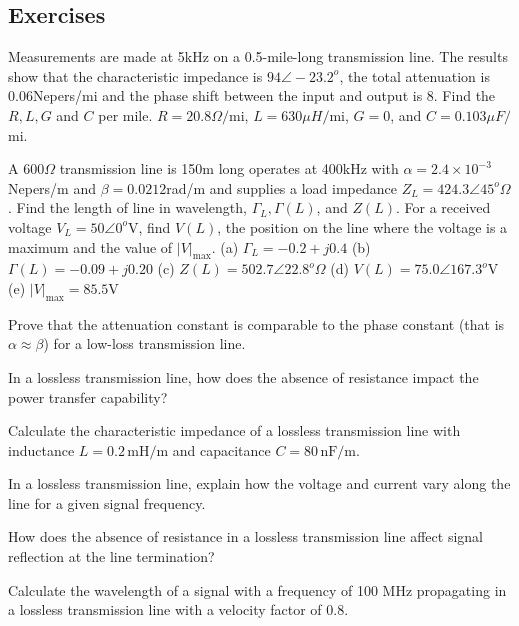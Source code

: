 \begin{mdframed}[backgroundcolor=lightblue, linewidth=1pt, hidealllines=true]
\section*{Exercises}
\begin{ExerciseList}
\Exercise[label={ex51}]
Measurements are made at 5kHz on a 0.5-mile-long transmission line. The results show that the characteristic impedance is $94\angle-23.2^o$, the total attenuation is 0.06Nepers/mi and the phase shift between the input and output is 8\textdegree. Find the $R, L, G$ and $C$ per mile.
\Answer[ref={ex51}]
$R = 20.8\varOmega/$mi, $L = 630\mu H/$mi, $G = 0$, and $C = 0.103\mu F/$mi.

\Exercise[label={ex52}]
A 600$\varOmega$ transmission line is 150m long operates at 400kHz with $\alpha = 2.4\times10^{-3}$Nepers/m and $\beta = 0.0212$rad/m and supplies a load impedance $Z_L = 424.3\angle45^o\varOmega$. Find the length of line in wavelength, $\Gamma_L, \Gamma(L)$, and $Z(L)$. For a received voltage $V_L = 50\angle0^o$V, find $V(L)$, the position on the line where the voltage is a maximum and the value of $|V|_\max$.
\Answer[ref={ex52}]
(a) $\Gamma_L = -0.2 + j0.4$ (b) $\Gamma(L) = -0.09 + j0.20$ (c) $Z(L) = 502.7\angle22.8^o\varOmega$ (d) $V(L) = 75.0\angle167.3^o$V (e) $|V|_\max = 85.5$V

\Exercise[label={ex53}]
Prove that the attenuation constant is comparable to the phase constant (that is $\alpha\approx\beta$) for a low-loss transmission line.

\Exercise[label={ex54}]
In a lossless transmission line, how does the absence of resistance impact the power transfer capability?

\Exercise[label={ex55}]
Calculate the characteristic impedance of a lossless transmission line with inductance \( L = 0.2 \, \text{mH/m} \) and capacitance \( C = 80 \, \text{nF/m} \).


\Exercise[label={ex57}]
In a lossless transmission line, explain how the voltage and current vary along the line for a given signal frequency.

\Exercise[label={ex58}]
How does the absence of resistance in a lossless transmission line affect signal reflection at the line termination?

\Exercise[label={ex59}]
Calculate the wavelength of a signal with a frequency of 100 MHz propagating in a lossless transmission line with a velocity factor of 0.8.

\end{ExerciseList}
\end{mdframed}

